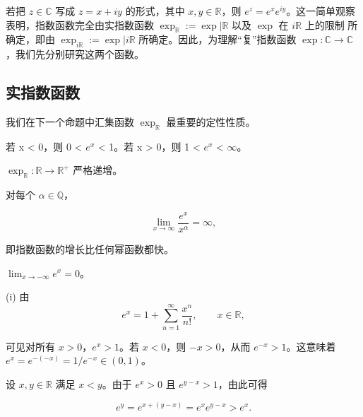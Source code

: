 若把 $ z \in \mathbb{C} $ 写成 $ z = x + iy $ 的形式，其中 $ x, y \in \mathbb{R} $，则 $ e^z = e^x e^{iy} $。这一简单观察表明，指数函数完全由实指数函数 $ \exp_{\mathbb{R}} := \exp | \mathbb{R} \text{ 以及 } \exp \text{ 在 } i\mathbb{R} \text{ 上的限制} $ 所确定，即由 $ \exp_{i\mathbb{R}} := \exp | i\mathbb{R} $ 所确定。因此，为理解“复”指数函数 $ \exp: \mathbb{C} \to \mathbb{C} $，我们先分别研究这两个函数。

\subsection*{实指数函数}

我们在下一个命题中汇集函数 $ \exp_{\mathbb{R}} $ 最重要的定性性质。

\begin{proposition}

\begin{subitems}
\item

若 x < 0，则 0 < $ e^{x} $ < 1。若 x > 0，则 1 < $ e^{x} $ < $ \infty $。

\item

$ \exp_{\mathbb{R}}: \mathbb{R} \to \mathbb{R}^+ $ 严格递增。

\item

对每个 $ \alpha \in \mathbb{Q} $，

\[
\lim_{x\to\infty}\frac{e^{x}}{x^\alpha}=\infty,
\]

即指数函数的增长比任何幂函数都快。

\item

$ \lim_{x \to -\infty} e^x = 0 $。

\proofhead
(i) 由
\[
e^{x}=1+\sum_{n=1}^{\infty}\frac{x^{n}}{n!},\qquad x\in\mathbb{R},
\]

可见对所有 $ x > 0 $，$ e^x > 1 $。若 $ x < 0 $，则 $ -x > 0 $，从而 $ e^{-x} > 1 $。这意味着 $ e^x = e^{-(-x)} = 1/e^{-x} \in (0,1) $。

\end{subitems}

\begin{subitems}
\item[（ii）]

设 $ x, y \in \mathbb{R} $ 满足 $ x < y $。由于 $ e^x > 0 $ 且 $ e^{y-x} > 1 $，由此可得

\[
e^{y}=e^{x+(y-x)}=e^{x}e^{y-x}>e^{x}.
\]
\item[（iii）]


\end{subitems}
\end{proposition}
